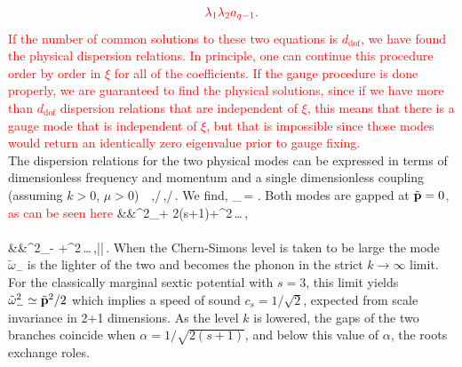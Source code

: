 \begin{align}
    \textcolor{red}{\lambda_1 \lambda_2 a_{q-1}.}
\end{align}
\textcolor{red}{If the number of common solutions to these two equations is $d_{\text{dof}}$, we have found the physical dispersion relations. In principle, one can continue this procedure order by order in $\xi$ for all of the coefficients. If the gauge procedure is done properly, we are guaranteed to find the physical solutions, since if we have more than $d_{\text{dof}}$ dispersion relations that are independent of $\xi$, this means that there is a gauge mode that is independent of $\xi$, but that is impossible since those modes would return an identically zero eigenvalue prior to gauge fixing.}\\
\indent The dispersion relations for the two physical modes can be expressed in terms of dimensionless frequency and  momentum  and a single dimensionless coupling (assuming $k>0$, $\mu>0$)
\be
\alpha\equiv\, \,,\qquad \tilde \omega\equiv\omega/\mu\,,\qquad {}/\mu\,.\label{alpha}
\ee
We find,
\be
\tilde\omega_{\pm}\,=\,\,.
\ee
Both modes are gapped at $\tilde{\bf p}=0$\textcolor{red}{, as can be seen here}
\bea
&&\tilde\omega^2_+\,\simeq\,2(s+1)+^2\,\ldots\,, \\\nonumber \\\nonumber
&&\tilde\omega^2_-\,\simeq\,+^2\,\ldots\,,\qquad\qquad ||\,.
\eea
When the Chern-Simons level is taken to be large the mode $\tilde\omega_{-}$ is the lighter of the two and becomes the phonon in the strict $k\to\infty$ limit.
For the classically marginal sextic potential with $s=3$, this limit yields $\tilde\omega_-^2\simeq \tilde {\bf p}^2/2$ which implies a speed of sound $c_s=1/\sqrt 2$, expected from scale invariance in 2+1 dimensions. As the level $k$ is lowered, the gaps of the two branches coincide when $\alpha=1/\sqrt{2(s+1)}$, and below this value of $\alpha$, the roots exchange roles.
